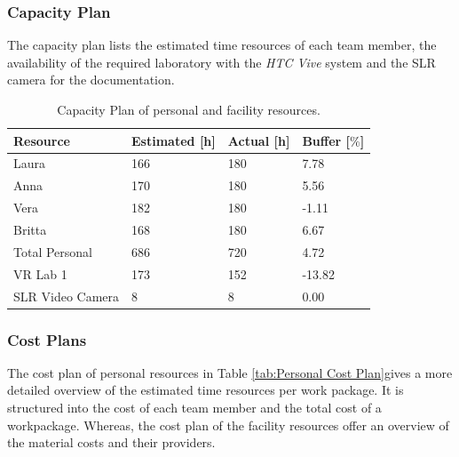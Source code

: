 \subsubsection{Capacity Plan}\label{sec:PMCapacity Plan}

The capacity plan lists the estimated time resources of each team member, the availability of the required laboratory with the \textit{HTC Vive} system and the SLR camera for the documentation.
\begin{table}[H]
	\centering
	\begin{tabular}{|l|l|l|l|}
		\hline
		\Absatzbox{}
		\textbf{Resource} &	\textbf{ Estimated [h]} &	\textbf{Actual [h]} & 	\textbf{Buffer [$\%$]}\\ \hline
		Laura &	166 &	180	& 7.78\\ \hline
		Anna&	170	&180&	5.56\\ \hline
		Vera&	182	&180&	-1.11\\ \hline
		Britta&	168&	180	&6.67\\ \hline
		Total Personal&	686	&720&	4.72\\ \hline
		VR Lab 1&	173&	152&	-13.82\\ \hline
		SLR Video Camera&	8&	8&	0.00\\ \hline
	\end{tabular}
	\caption[]{Capacity Plan of personal and facility resources.}
	\label{tab:Capacity Plan}
\end{table}

\subsubsection{Cost Plans}\label{sec:PMCostPlan}

The cost plan of personal resources in Table \ref{tab:Personal Cost Plan}gives a more detailed overview of the estimated time resources per work package. It is structured into the cost of each team member and the total cost of a workpackage. Whereas, the cost plan of the facility resources offer an overview of the material costs and their providers.

